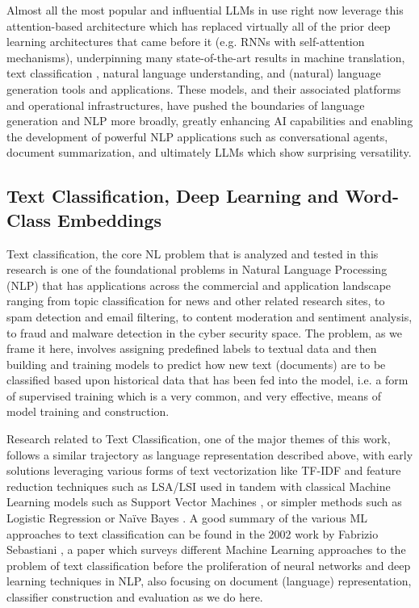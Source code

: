 \documentclass[final]{clv2025}
\begin{document}
Almost all the most popular and influential LLMs in use right now leverage this attention-based architecture which has replaced virtually all of the prior deep learning architectures that came before it (e.g. RNNs with self-attention mechanisms), underpinning many state-of-the-art results in machine translation, text classification \cite{devlin-etal-2019-bert}, natural language understanding, and (natural) language generation tools \cite{radford2019language} and applications. These models, and their associated platforms and operational infrastructures, have pushed the boundaries of language generation and NLP more broadly, greatly enhancing AI capabilities and enabling the development of powerful NLP applications such as conversational agents, document summarization, and ultimately LLMs which show surprising versatility.

\subsection{Text Classification, Deep Learning and Word-Class Embeddings}

Text classification, the core NL problem that is analyzed and tested in this research is one of the foundational problems in Natural Language Processing (NLP) that has applications across the commercial and application landscape ranging from topic classification for news and other related research sites, to spam detection and email filtering, to content moderation and sentiment analysis, to fraud and malware detection in the cyber security space. The problem, as we frame it here, involves assigning predefined labels to textual data and then building and training models to predict how new text (documents) are to be classified based upon historical data that has been fed into the model, i.e. a form of supervised training which is a very common, and very effective, means of model training and construction.

Research related to Text Classification, one of the major themes of this work, follows a similar trajectory as language representation described above, with early solutions leveraging various forms of text vectorization like TF-IDF \cite{sparckjones1972statistical} and feature reduction techniques such as LSA/LSI \cite{deerwester} used in tandem with classical Machine Learning models such as Support Vector Machines \cite{joachims1998text}, or simpler methods such as Logistic Regression or Naïve Bayes \cite{mccallum1998comparison}. A good summary of the various ML approaches to text classification can be found in the 2002 work by Fabrizio Sebastiani \cite{sebastiani2002machine}, a paper which surveys different Machine Learning approaches to the problem of text classification before the proliferation of neural networks and deep learning techniques in NLP, also focusing on document (language) representation, classifier construction and evaluation as we do here.
\end{document}
